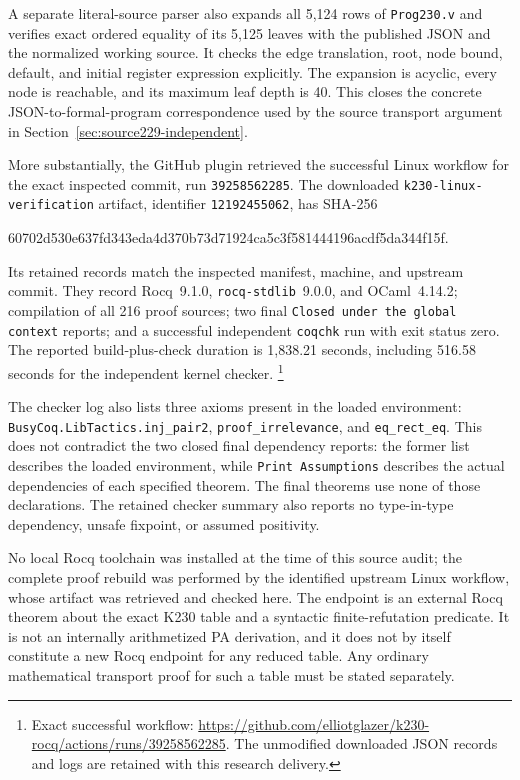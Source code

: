 A separate literal-source parser also expands all 5,124 rows of
\texttt{Prog230.v} and verifies exact ordered equality of its 5,125
leaves with the published JSON and the normalized working source.
It checks the edge translation, root, node bound, default, and initial
register expression explicitly.  The expansion is acyclic, every
node is reachable, and its maximum leaf depth is 40.  This closes
the concrete JSON-to-formal-program correspondence used by the source
transport argument in Section~\ref{sec:source229-independent}.

More substantially, the GitHub plugin retrieved the successful Linux
workflow for the exact inspected commit, run
\texttt{39258562285}.  The downloaded
\texttt{k230-linux-verification} artifact, identifier
\texttt{12192455062}, has SHA-256
\begin{center}\scriptsize\ttfamily
60702d530e637fd343eda4d370b73d71924ca5c3f581444196acdf5da344f15f.
\end{center}
Its retained records match the inspected manifest, machine, and upstream
commit.  They record Rocq~9.1.0, \texttt{rocq-stdlib}~9.0.0, and
OCaml~4.14.2; compilation of all 216 proof sources; two final
\texttt{Closed under the global context} reports; and a successful
independent \texttt{coqchk} run with exit status zero.  The reported
build-plus-check duration is 1,838.21 seconds, including 516.58 seconds
for the independent kernel checker.
\footnote{Exact successful workflow:
\url{https://github.com/elliotglazer/k230-rocq/actions/runs/39258562285}.
The unmodified downloaded JSON records and logs are retained with this
research delivery.}

The checker log also lists three axioms present in the loaded environment:
\nolinkurl{BusyCoq.LibTactics.inj_pair2},
\texttt{proof\_irrelevance}, and \texttt{eq\_rect\_eq}.
This does not contradict the two closed final dependency reports:
the former list describes the loaded environment, while
\texttt{Print Assumptions} describes the actual dependencies of each
specified theorem.  The final theorems use none of those declarations.
The retained checker summary also reports no type-in-type dependency,
unsafe fixpoint, or assumed positivity.

No local Rocq toolchain was installed at the time of this source audit;
the complete proof rebuild was performed by the identified upstream
Linux workflow, whose artifact was retrieved and checked here.
The endpoint is an external Rocq theorem about the exact K230 table
and a syntactic finite-refutation predicate.  It is not an internally
arithmetized PA derivation, and it does not by itself constitute a new
Rocq endpoint for any reduced table.  Any ordinary mathematical
transport proof for such a table must be stated separately.
